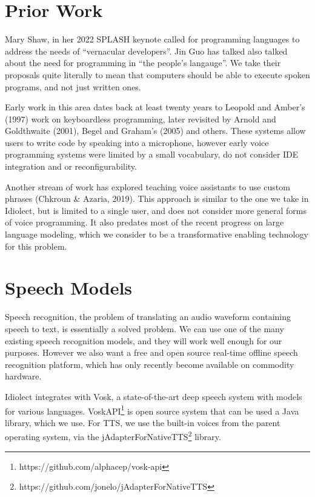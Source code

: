 \documentclass[conference]{IEEEtran}
\begin{document}
\section{Prior Work}

Mary Shaw, in her 2022 SPLASH keynote called for programming languages to address the needs of ``vernacular developers''. Jin Guo has talked also talked about the need for programming in ``the people's langauge''. We take their proposals quite literally to mean that computers should be able to execute spoken programs, and not just written ones.

Early work in this area dates back at least twenty years to Leopold and Amber's (1997) work on keyboardless programming, later revisited by Arnold and Goldthwaite (2001), Begel and Graham's (2005) and others. These systems allow users to write code by speaking into a microphone, however early voice programming systems were limited by a small vocabulary, do not consider IDE integration and or reconfigurability.

Another stream of work has explored teaching voice assistants to use custom phrases (Chkroun \& Azaria, 2019). This approach is similar to the one we take in Idiolect, but is limited to a single user, and does not consider more general forms of voice programming. It also predates most of the recent progress on large language modeling, which we consider to be a transformative enabling technology for this problem.

\section{Speech Models}

Speech recognition, the problem of translating an audio waveform containing speech to text, is essentially a solved problem. We can use one of the many existing speech recognition models, and they will work well enough for our purposes. However we also want a free and open source real-time offline speech recognition platform, which has only recently become available on commodity hardware.

Idiolect integrates with Vosk, a state-of-the-art deep speech system with models for various languages. VoskAPI\footnote{https://github.com/alphacep/vosk-api} is open source system that can be used a Java library, which we use. For TTS, we use the built-in voices from the parent operating system, via the jAdapterForNativeTTS\footnote{https://github.com/jonelo/jAdapterForNativeTTS} library.
\end{document}
